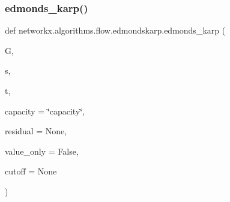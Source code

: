 \subsubsection{\texorpdfstring{edmonds\+\_\+karp()}{edmonds\_karp()}}
{\footnotesize\ttfamily def networkx.\+algorithms.\+flow.\+edmondskarp.\+edmonds\+\_\+karp (\begin{DoxyParamCaption}\item[{}]{G,  }\item[{}]{s,  }\item[{}]{t,  }\item[{}]{capacity = {\ttfamily \char`\"{}capacity\char`\"{}},  }\item[{}]{residual = {\ttfamily None},  }\item[{}]{value\+\_\+only = {\ttfamily False},  }\item[{}]{cutoff = {\ttfamily None} }\end{DoxyParamCaption})}

